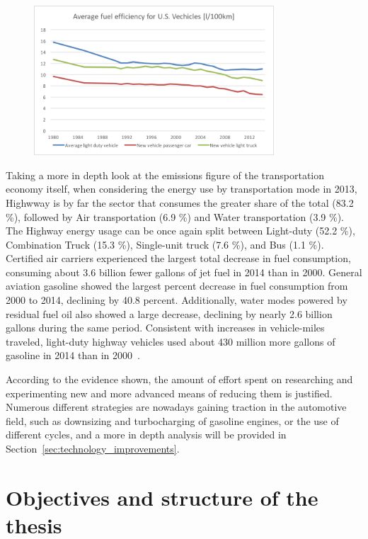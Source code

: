 \begin{figure}[ht]
  \centering
  \includegraphics[width=0.8\textwidth]{figures/introduction/average_fuel_efficiency.png}
  \caption{\label{fig:average_fuel_efficiency} }
\end{figure}

Taking a more in depth look at the emissions figure of the transportation economy itself, when considering the energy use by transportation mode in 2013, Highwway is by far the sector that consumes the greater share of the total (83.2 \%), followed by Air transportation (6.9 \%) and Water transportation (3.9 \%). The Highway energy usage can be once again split between Light-duty (52.2 \%), Combination Truck (15.3 \%), Single-unit truck (7.6 \%), and Bus (1.1 \%). Certified air carriers experienced the largest total decrease in fuel consumption, consuming about 3.6 billion fewer gallons of jet fuel in 2014 than in 2000. General aviation gasoline showed the largest percent decrease in fuel consumption from 2000 to 2014, declining by 40.8 percent. Additionally, water modes powered by residual fuel oil also showed a large decrease, declining by nearly 2.6 billion gallons during the same period. Consistent with increases in vehicle-miles traveled, light-duty highway vehicles used about 430 million more gallons of gasoline in 2014 than in 2000~\cite{BureauofTransportationStatistics2016a}.

According to the evidence shown, the amount of effort spent on researching and experimenting new and more advanced means of reducing them is justified. Numerous different strategies are nowadays gaining traction in the automotive field, such as downsizing and turbocharging of gasoline engines, or the use of different cycles, and a more in depth analysis will be provided in Section~\ref{sec:technology_improvements}.

\section{Objectives and structure of the thesis}

